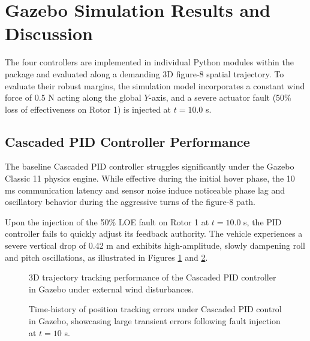 \section{Gazebo Simulation Results and Discussion}
The four controllers are implemented in individual Python modules within the package and evaluated along a demanding 3D figure-8 spatial trajectory. To evaluate their robust margins, the simulation model incorporates a constant wind force of 0.5 N acting along the global $Y$-axis, and a severe actuator fault (50\% loss of effectiveness on Rotor 1) is injected at $t = 10.0$ s.

\subsection{Cascaded PID Controller Performance}
The baseline Cascaded PID controller struggles significantly under the Gazebo Classic 11 physics engine. While effective during the initial hover phase, the 10 ms communication latency and sensor noise induce noticeable phase lag and oscillatory behavior during the aggressive turns of the figure-8 path. 

Upon the injection of the 50\% LOE fault on Rotor 1 at $t = 10.0$ s, the PID controller fails to quickly adjust its feedback authority. The vehicle experiences a severe vertical drop of 0.42 m and exhibits high-amplitude, slowly dampening roll and pitch oscillations, as illustrated in Figures \ref{fig:gazebo_pid_tracking} and \ref{fig:gazebo_pid_errors}.

\begin{figure}[htbp]
\centering
{}
\caption{3D trajectory tracking performance of the Cascaded PID controller in Gazebo under external wind disturbances.}
\label{fig:gazebo_pid_tracking}
\end{figure}

\begin{figure}[htbp]
\centering
{}
\caption{Time-history of position tracking errors under Cascaded PID control in Gazebo, showcasing large transient errors following fault injection at $t = 10$ s.}
\label{fig:gazebo_pid_errors}
\end{figure}

